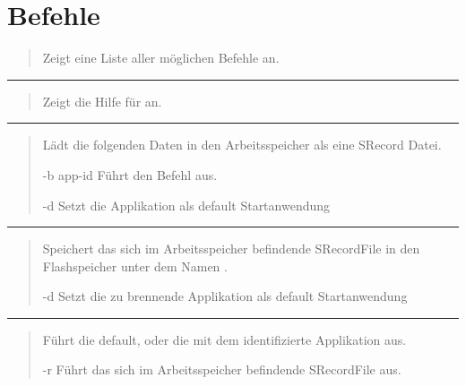 \documentclass[letterpaper,10pt,ngerman]{manual}
\begin{document}
\resetcurrentobjects
\hypertarget{--doc-specification/commands}{}

\section{Befehle}
\hypertarget{todo-3}{}
\begin{quote}

Zeigt eine Liste aller möglichen Befehle an.
\end{quote}


\bigskip\hrule{}\bigskip


\begin{quote}

Zeigt die Hilfe für  an.
\end{quote}


\bigskip\hrule{}\bigskip


\begin{quote}

Lädt die folgenden Daten in den Arbeitsspeicher als eine SRecord Datei.
\begin{optionlist}{3cm}
\item [-b app-id]  
Führt den Befehl  aus.
\item [-d]  
Setzt die Applikation als default Startanwendung
\end{optionlist}
\end{quote}


\bigskip\hrule{}\bigskip


\begin{quote}

Speichert das sich im Arbeitsspeicher befindende SRecordFile in den Flashspeicher unter dem Namen .
\begin{optionlist}{3cm}
\item [-d]  
Setzt die zu brennende Applikation als default Startanwendung
\end{optionlist}
\end{quote}


\bigskip\hrule{}\bigskip


\begin{quote}

Führt die default, oder die mit dem  identifizierte Applikation aus.
\begin{optionlist}{3cm}
\item [-r]  
Führt das sich im Arbeitsspeicher befindende SRecordFile aus.
\end{optionlist}
\end{quote}
\end{document}
